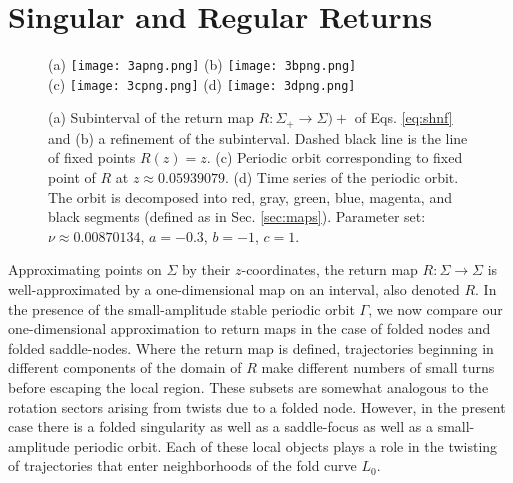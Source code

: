 \documentclass[aip, cha, sd, amsmath,amssymb, preprint]{revtex4-1}
\begin{document}
\section{\label{sec:maps} Singular and Regular Returns}

\begin{figure}
(a) \texttt{[image: 3apng.png]}
(b) \texttt{[image: 3bpng.png]}\\
(c) \texttt{[image: 3cpng.png]}
(d) \texttt{[image: 3dpng.png]}
\caption{\label{fig:retmap2}  (a) Subinterval of the return map $R: \Sigma_+ \to \Sigma)+$  of Eqs. \eqref{eq:shnf} and (b) a refinement of the subinterval. Dashed black line is the line of fixed points $R(z) = z$. (c) Periodic orbit corresponding to fixed point of $R$ at $z \approx 0.05939079$. (d) Time series of the periodic orbit. The orbit is decomposed into red, gray, green, blue, magenta, and black segments (defined as in Sec. \ref{sec:maps}). Parameter set: $\nu \approx 0.00870134$, $a = -0.3$, $b = -1$, $c = 1$.}
\end{figure}

Approximating points on $\Sigma$ by their $z$-coordinates, the return map $R: \Sigma \to \Sigma$ is well-approximated by a one-dimensional map on an interval, also denoted $R$. In the presence of the small-amplitude stable periodic orbit $\Gamma$, we now compare our one-dimensional approximation to return maps in the case of folded nodes\cite{wechselberger2005} and folded saddle-nodes\cite{guckenheimer2008chaos,krupa2010}. Where the return map is defined, trajectories beginning in different components of the domain of $R$ make different numbers of small turns before escaping the local region. These subsets are somewhat analogous to the rotation sectors arising from twists due to a folded node.\cite{wechselberger2005} However, in the present case there is a folded singularity as well as a saddle-focus as well as a small-amplitude periodic orbit. Each of these local objects plays a role in the twisting of trajectories that enter neighborhoods of the fold curve $L_0$.
\end{document}
